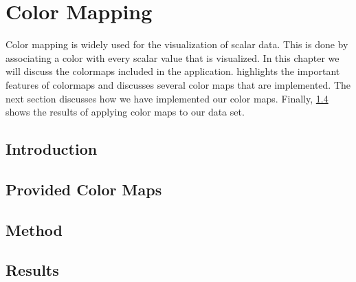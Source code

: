 
\chapter{Color Mapping} %
\label{cha:color_mapping}

Color mapping is widely used for the visualization of scalar data. This is done by associating a color with every scalar value that is visualized. In this chapter we will discuss the colormaps included in the application.  highlights the important features of colormaps and discusses several color maps that are implemented. The next section discusses how we have implemented our color maps. Finally, \cref{s:colormapping:results} shows the results of applying color maps to our data set.  

\section{Introduction}
\label{s:colormapping:introduction}


\section{Provided Color Maps}
\label{s:colormaps:differentmaps}


\section{Method}
\label{s:colormapping:method}





\section{Results}
\label{s:colormapping:results}


